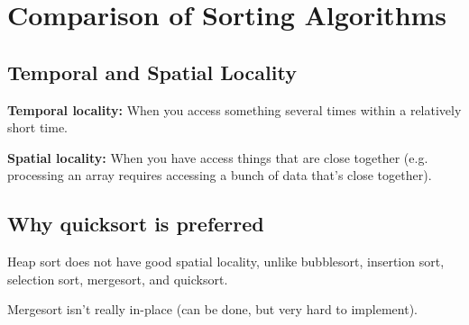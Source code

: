 \section{Comparison of Sorting Algorithms}

\subsection*{Temporal and Spatial Locality}

\textbf{Temporal locality:} When you access something several times within a relatively short time.

\textbf{Spatial locality:} When you have access things that are close together (e.g. processing an array requires accessing a bunch of data that's close together).

\subsection*{Why quicksort is preferred}

Heap sort does not have good spatial locality, unlike bubblesort, insertion sort, selection sort, mergesort, and quicksort.

Mergesort isn't really in-place (can be done, but very hard to implement).

